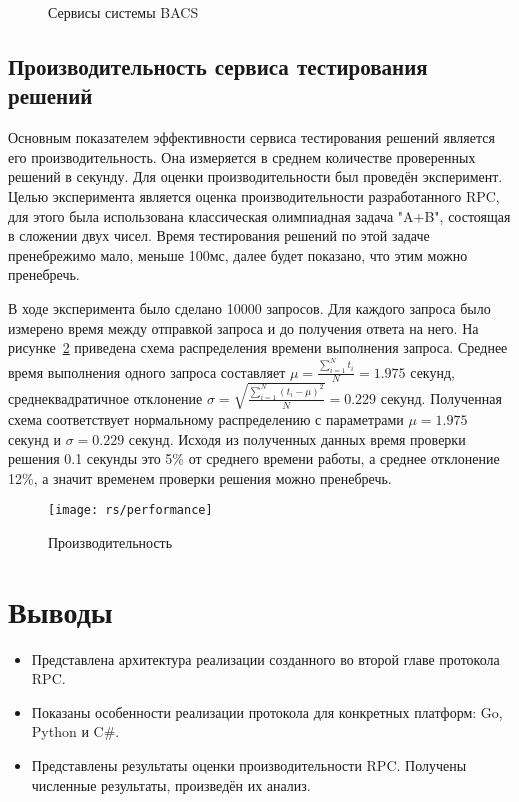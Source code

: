 \begin{figure}[H]
    \centering
    
    \caption{Сервисы системы BACS}
    \label{fig:bacsservice}
\end{figure}

\subsection{Производительность сервиса тестирования решений}
Основным показателем эффективности сервиса тестирования решений является
его производительность. Она измеряется в среднем количестве проверенных решений
в секунду. Для оценки производительности был проведён эксперимент.
Целью эксперимента является оценка производительности разработанного RPC,
для этого была использована классическая олимпиадная задача "A+B", состоящая
в сложении двух чисел. Время тестирования решений по этой задаче пренебрежимо
мало, меньше 100мс, далее будет показано, что этим можно пренебречь.

В ходе эксперимента было сделано 10000 запросов. Для каждого запроса
было измерено время между отправкой запроса и до получения ответа на него.
На рисунке~\ref{fig:performance} приведена схема распределения времени
выполнения запроса. Среднее время выполнения одного запроса составляет
$\mu = \frac{\sum_{i=1}^N t_i}{N} = 1.975$ секунд, среднеквадратичное отклонение
$\sigma = \sqrt{\frac{\sum_{i=1}^N \left(t_i - \mu\right)^2}{N}} = 0.229$
секунд. Полученная схема соответствует нормальному распределению с параметрами
$\mu = 1.975$ секунд и $\sigma = 0.229$ секунд. Исходя из полученных данных
время проверки решения 0.1 секунды это 5\% от среднего времени работы,
а среднее отклонение 12\%, а значит временем проверки решения можно пренебречь.

\begin{figure}[H]
    \centering
    \texttt{[image: rs/performance]}
    \caption{Производительность}
    \label{fig:performance}
\end{figure}

\section{Выводы}
\begin{itemize}
    \item Представлена архитектура реализации созданного во второй главе
        протокола RPC.
    \item Показаны особенности реализации протокола для конкретных платформ:
        Go, Python и C\#.
    \item Представлены результаты оценки производительности RPC. Получены
        численные результаты, произведён их анализ.
\end{itemize}

